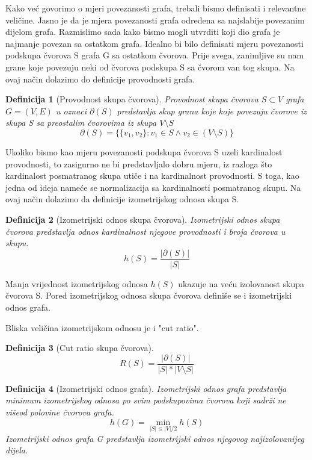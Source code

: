 \documentclass[11pt]{article}
\newtheorem{definition}{Definicija}
\begin{document}
	Kako već govorimo o mjeri povezanosti grafa, trebali bismo definisati i relevantne veličine.
	Jasno je da je mjera povezanosti grafa određena sa najslabije povezanim dijelom grafa.
	Razmislimo sada kako bismo mogli utvrditi koji dio grafa je najmanje povezan sa ostatkom grafa.
	Idealno bi bilo definisati mjeru povezanosti podskupa čvorova S grafa G sa ostatkom čvorova.
    Prije svega, zanimljive su nam grane koje povezuju neki od čvorova podskupa S sa čvorom van tog skupa.
	Na ovaj način dolazimo do definicije provodnosti grafa.

	\begin{definition}[Provodnost skupa čvorova]
		Provodnost skupa čvorova $S \subset V$ grafa $G=(V,E)$ u oznaci $\partial(S)$ predstavlja skup grana koje koje povezuju čvorove iz skupa S sa preostalim čvorovima iz skupa $V \setminus S$
		\[ \partial(S) = \{ \{v_1,v_2\}: v_1 \in S \land v_2 \in (V \setminus S)\} \]
	\end{definition}

    Ukoliko bismo kao mjeru povezanosti podskupa čvorova S uzeli kardinalost provodnosti, to zasigurno ne bi predstavljalo dobru mjeru,
	iz razloga što kardinalost posmatranog skupa utiče i na kardinalnost provodnosti. 
	S toga, kao jedna od ideja nameće se normalizacija sa kardinalnosti posmatranog skupu.
	Na ovaj način dolazimo da definicije izometrijskog odnosa skupa S.

    \begin{definition}[Izometrijski odnos skupa čvorova]
		Izometrijski odnos skupa čvorova predstavlja odnos kardinalnost njegove provodnosti i broja čvorova u skupu.
		\[
			h(S) = \frac{|\partial(S)|}{|S|}
		\]
	\end{definition}

	Manja vrijednost izometrijskog odnosa $h(S)$ ukazuje na veću izolovanost skupa čvorova S.
    Pored izometrijskog odnosa skupa čvorova definiše se i izometrijski odnos grafa.

	Bliska veličina izometrijskom odnosu je i "cut ratio".

	\begin{definition}[Cut ratio skupa čvorova]
		\[
			R(S) = \frac{|\partial(S)|}{|S| * |V \setminus S|}
		\]
	\end{definition}
	
    \begin{definition}[Izometrijski odnos grafa]
		Izometrijski odnos grafa predstavlja minimum izometrijskog odnosa po svim podskupovima čvorova koji sadrži ne višeod polovine čvorova grafa.
		\[
				h(G) = \min_{|S| \leq |V| / 2} h(S)
		\]
		Izometrijski odnos grafa G predstavlja izometrijski odnos njegovog najizolovanijeg dijela.
	\end{definition}
\end{document}
